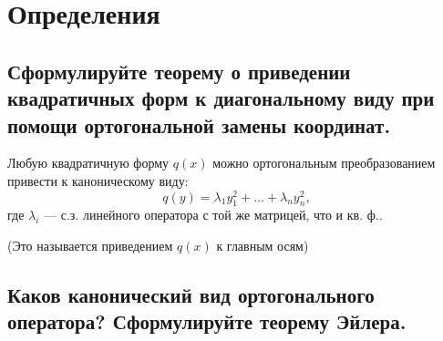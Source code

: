 \section{Определения}

\subsection{Сформулируйте теорему о приведении квадратичных форм к диагональному виду при помощи ортогональной замены координат.}
\begin{theorem}
    Любую квадратичную форму $q(x)$ можно ортогональным преобразованием привести к каноническому виду:
    \[
        q(y)=\lambda_1 y_1^2+\ldots+\lambda_n y_n^2,
    \]
    где $\lambda_i$ --- с.з. линейного оператора с той же матрицей, что и кв. ф..
    
    (Это называется приведением $q(x)$ к главным осям)
\end{theorem}
\subsection{Каков канонический вид ортогонального оператора? Сформулируйте теорему Эйлера.}

